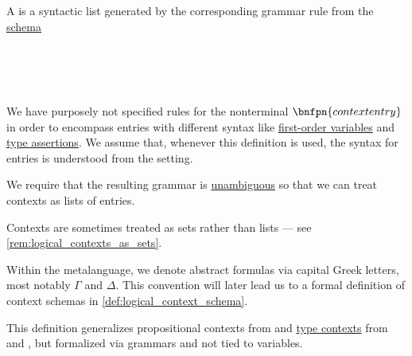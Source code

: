 \begin{definition}\label{def:logical_context}\mimprovised
  A  is a syntactic list generated by the corresponding grammar rule from the \hyperref[def:formal_grammar/schema]{schema}
  \begin{bnf*}
        { \bnfor} \\
     \\
           {\bnfves} \\
                 { \bnfor {}}
  \end{bnf*}

  We have purposely not specified rules for the nonterminal \( \bnfpn{context entry} \) in order to encompass entries with different syntax like \hyperref[def:fol_term]{first-order variables} and \hyperref[def:type_assertion]{type assertions}. We assume that, whenever this definition is used, the syntax for entries is understood from the setting.

  We require that the resulting grammar is \hyperref[def:grammar_ambiguity]{unambiguous} so that we can treat contexts as lists of entries.
\end{definition}
\begin{comments}
  \item Contexts are sometimes treated as sets rather than lists --- see \cref{rem:logical_contexts_as_sets}.

  \item Within the metalanguage, we denote abstract formulas via capital Greek letters, most notably \( \Gamma \) and \( \Delta \). This convention will later lead us to a formal definition of context schemas in \cref{def:logical_context_schema}.

  \item This definition generalizes propositional contexts from \cite[45]{Mimram2020ProgramEqualsProof} and \hyperref[def:type_context]{type contexts} from \cite[159]{Mimram2020ProgramEqualsProof} and \cite[def. 2A5]{Hindley1997BasicSTT}, but formalized via grammars and not tied to variables.
\end{comments}

